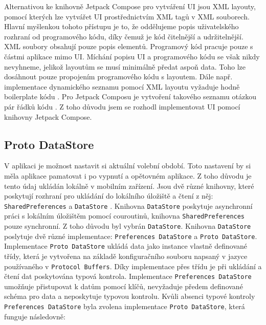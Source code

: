 \noindent Alternativou ke knihovně Jetpack Compose pro vytváření UI jsou XML layouty, pomocí kterých lze vytvářet UI prostřednictvím XML tagů v XML souborech. Hlavní myšlenkou tohoto přístupu je to, že oddělujeme popis uživatelského rozhraní od programového kódu, díky čemuž je kód čitelnější a udržitelnější. XML soubory obsahují pouze popis elementů. Programový kód pracuje pouze s částmi aplikace mimo UI. Míchání popisu UI a programového kódu se však nikdy nevyhneme, jelikož layoutům se musí minimálně předat aspoň data. Toho lze dosáhnout pouze propojením programového kódu s layoutem. Dále např. implementace dynamického seznamu pomocí XML layoutu vyžaduje hodně boilerplate kódu \cite{recycler-view}. Pro Jetpack Composu je vytvoření takového seznamu otázkou pár řádků kódu \cite{lazy-column}. Z toho důvodu jsem se rozhodl implementovat UI pomocí knihovny Jetpack Compose.

\subsection*  {Proto DataStore}
V aplikaci je možnost nastavit si aktuální volební období. Toto nastavení by si měla aplikace pamatovat i po vypnutí a opětovném aplikace. Z toho důvodu je tento údaj ukládán lokálně \linebreak v mobilním zařízení. Jsou dvě různé knihovny, které poskytují rozhraní pro ukládání do lokálního úložiště a čtení z něj: \lstinline|SharedPreferences| \cite{shared-preferences} a \lstinline|DataStore| \cite{data-store}. Knihovna \lstinline|DataStore| poskytuje asynchronní práci s lokálním úložištěm pomocí couroutinů, knihovna \lstinline|SharedPreferences| pouze synchronní. Z toho důvodu byl vybrán \lstinline|DataStore|. Knihovna \lstinline|DataStore| poslytuje dvě různé implementace: \lstinline|Preferences DataStore| a \lstinline|Proto DataStore|. Implementace \lstinline|Proto DataStore| ukládá data jako instance vlastně definované třídy, která je vytvořena na základě konfiguračního souboru napsaný v jazyce používaného v \lstinline|Protocol Buffers|. Díky implementace přes třídu je při ukládání a čtení dat poskytována typová kontrola. Implementace \lstinline|Preferences DataStore| umožňuje přistupovat k datům pomocí klíčů, nevyžaduje předem definované schéma pro data a neposkytuje typovou kontrolu. Kvůli absenci typové kontroly \lstinline|Preferences DataStore| byla zvolena implementace \lstinline|Proto DataStore|, která funguje následovně:

